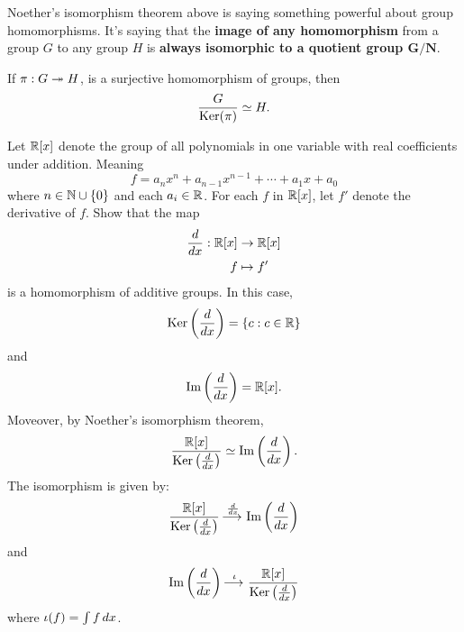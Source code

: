 \documentclass{ximera}
\begin{document}
Noether's isomorphism theorem above is saying something powerful about
group homomorphisms. It's saying that the \textbf{image of any
  homomorphism} from a group $G$ to any group $H$ is \textbf{always
  isomorphic to a quotient group $\boldsymbol{G/N}$}.


\begin{corollary}
  If $\pi:G\twoheadrightarrow H$, is a surjective homomorphism of groups, then
  \[
  \frac{G}{\mathop{\mathrm{Ker}}\nolimits(\pi)} \simeq H.
  \]
\end{corollary}


\begin{example}
  Let $\mathbb R[x]$ denote the group of all polynomials in one variable with
  real coefficients under addition. Meaning
  \[
  f = a_nx^{n} + a_{n-1}x^{n-1} + \cdots + a_1x + a_0
  \]
  where $n\in\mathbb N\cup\{0\}$ and each $a_i\in\mathbb R$.  For each $f$ in $\mathbb R[x]$,
  let $f'$ denote the derivative of $f$. Show that the map
  \begin{align*}
    \frac{d}{dx}:\mathbb R[x]&\to\mathbb R[x]\\
    f  &\mapsto f'
  \end{align*}
  is a homomorphism of additive groups.  In this case,
  \[
  \mathop{\mathrm{Ker}}\nolimits\left(\frac{d}{dx}\right) = \{c:c\in \mathbb R\}
  \]
  and
  \[
  \operatorname{Im}\left(\frac{d}{dx}\right) =\mathbb R[x].
  \]
  Moveover, by Noether's isomorphism theorem,
  \[
  \frac{\mathbb R[x]}{\mathop{\mathrm{Ker}}\nolimits\left(\frac{d}{dx}\right)} \simeq \operatorname{Im}\left(\frac{d}{dx}\right).
  \]
  The isomorphism is given by:
  \[
  \frac{\mathbb R[x]}{\mathop{\mathrm{Ker}}\nolimits\left(\frac{d}{dx}\right)} \mathop{\longrightarrow\,}\limits^{\frac{d}{dx}} \operatorname{Im}\left(\frac{d}{dx}\right)
  \]
  and
  \[
  \operatorname{Im}\left(\frac{d}{dx}\right) \mathop{\longrightarrow\,}\limits^{\iota}\frac{\mathbb R[x]}{\mathop{\mathrm{Ker}}\nolimits\left(\frac{d}{dx}\right)}
  \]
  where $\iota(f) = \int f \, d x$.
\end{example}
\end{document}

